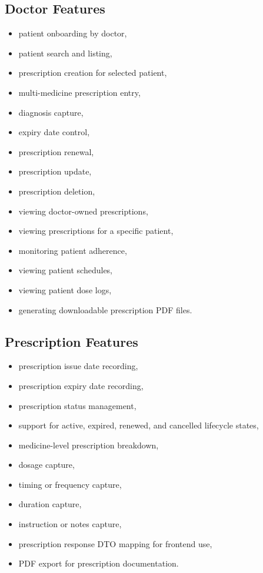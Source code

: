 \documentclass[12pt,a4paper]{article}
\begin{document}
\subsection{Doctor Features}
\begin{itemize}[leftmargin=*]
  \item patient onboarding by doctor,
  \item patient search and listing,
  \item prescription creation for selected patient,
  \item multi-medicine prescription entry,
  \item diagnosis capture,
  \item expiry date control,
  \item prescription renewal,
  \item prescription update,
  \item prescription deletion,
  \item viewing doctor-owned prescriptions,
  \item viewing prescriptions for a specific patient,
  \item monitoring patient adherence,
  \item viewing patient schedules,
  \item viewing patient dose logs,
  \item generating downloadable prescription PDF files.
\end{itemize}

\subsection{Prescription Features}
\begin{itemize}[leftmargin=*]
  \item prescription issue date recording,
  \item prescription expiry date recording,
  \item prescription status management,
  \item support for active, expired, renewed, and cancelled lifecycle states,
  \item medicine-level prescription breakdown,
  \item dosage capture,
  \item timing or frequency capture,
  \item duration capture,
  \item instruction or notes capture,
  \item prescription response DTO mapping for frontend use,
  \item PDF export for prescription documentation.
\end{itemize}
\end{document}
